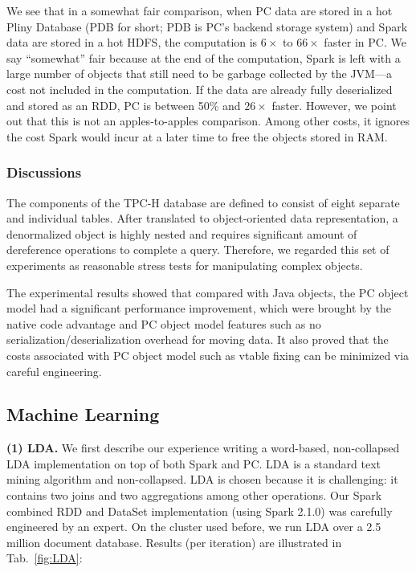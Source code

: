 We see that in a somewhat fair comparison, when PC data are
stored in a hot Pliny Database (PDB for short; PDB is PC's backend storage system) and Spark data
are stored in
a hot HDFS, the computation is $6\times$ to $66\times$ faster in PC.  We say ``somewhat'' fair
because at the end of the computation, Spark is left with a large number of objects that still need to be 
garbage collected by the JVM---a cost not included in the computation. If the data are already
fully deserialized and stored as an RDD, PC is 
between 50\% and $26\times$ faster.  However, we point out that this is not an apples-to-apples comparison.
Among other costs, it ignores
the cost Spark would incur at a later time to free the objects stored
in RAM.

\subsubsection{Discussions} 
The components of the TPC-H database are defined to
consist of eight separate and individual tables. After translated to
object-oriented data representation, a denormalized object is highly
nested and requires significant amount of dereference
operations to complete a query. Therefore, we regarded this set of
experiments as reasonable stress
tests for manipulating complex objects. 

The experimental results showed that
compared with Java objects, the PC
object model had a significant performance improvement, which were
brought by the native code advantage and PC object model features such
as no serialization/deserialization overhead for moving data. It
also proved that the costs associated with PC object model such as
vtable fixing can be minimized via careful engineering.

\subsection {Machine Learning}
\vspace{5pt}
\noindent
\textbf {(1) LDA.} We first describe our experience writing a word-based, non-collapsed LDA implementation \cite{jermaineExperimental} on top of
both Spark and PC.  LDA is a standard text mining algorithm and
non-collapsed. 
LDA is chosen because
it is challenging:
it contains two joins and two aggregations among other operations.
Our Spark combined RDD and DataSet        
implementation (using Spark 2.1.0) was carefully engineered by an expert.
On the cluster used before, we run LDA over a 2.5 million document
database.  Results (per iteration) are illustrated in Tab.~\ref{fig:LDA}:

